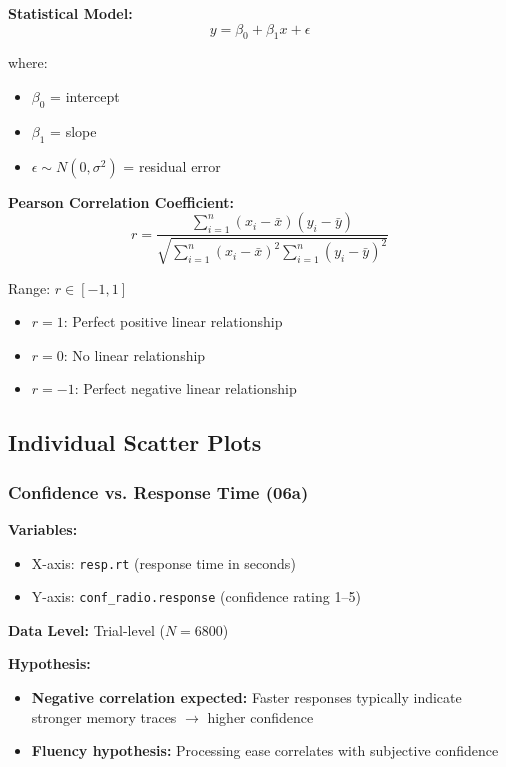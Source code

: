 \documentclass[12pt,a4paper]{article}
\begin{document}
\textbf{Statistical Model:}
\begin{equation}
y = \beta_0 + \beta_1 x + \epsilon
\end{equation}

where:
\begin{itemize}
    \item $\beta_0$ = intercept
    \item $\beta_1$ = slope
    \item $\epsilon \sim N(0, \sigma^2)$ = residual error
\end{itemize}

\textbf{Pearson Correlation Coefficient:}
\begin{equation}
r = \frac{\sum_{i=1}^{n}(x_i - \bar{x})(y_i - \bar{y})}{\sqrt{\sum_{i=1}^{n}(x_i - \bar{x})^2 \sum_{i=1}^{n}(y_i - \bar{y})^2}}
\end{equation}

Range: $r \in [-1, 1]$
\begin{itemize}
    \item $r = 1$: Perfect positive linear relationship
    \item $r = 0$: No linear relationship
    \item $r = -1$: Perfect negative linear relationship
\end{itemize}

\subsection{Individual Scatter Plots}

\subsubsection{Confidence vs. Response Time (06a)}

\textbf{Variables:}
\begin{itemize}
    \item X-axis: \texttt{resp.rt} (response time in seconds)
    \item Y-axis: \texttt{conf\_radio.response} (confidence rating 1--5)
\end{itemize}

\textbf{Data Level:} Trial-level ($N=6800$)

\textbf{Hypothesis:} 
\begin{itemize}
    \item \textbf{Negative correlation expected:} Faster responses typically indicate stronger memory traces $\rightarrow$ higher confidence
    \item \textbf{Fluency hypothesis:} Processing ease correlates with subjective confidence
\end{itemize}
\end{document}
